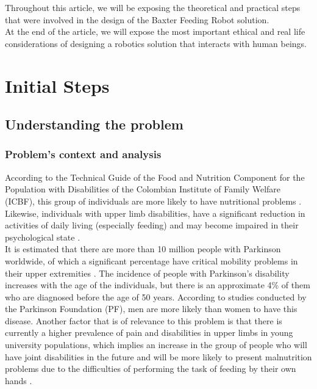 \documentclass[11pt]{report} %
\begin{document}
Throughout this article, we will be exposing the theoretical and practical steps that were involved in the design of the Baxter Feeding Robot solution.\\

At the end of the article, we will expose the most important ethical and real life considerations of designing a robotics solution that interacts with human beings.


\chapter{Initial Steps}

\section{Understanding the problem}

\subsection{Problem's context and analysis}

According to the Technical Guide of the Food and Nutrition Component for the Population with Disabilities of the Colombian Institute of Family Welfare (ICBF), this group of individuals are more likely to have nutritional problems \citep{cite_ICBF_technical_article}. Likewise, individuals with upper limb disabilities, have a significant reduction in activities of daily living (especially feeding) and may become impaired in their psychological state \citep{cite_upper_limb_disabilities_self_steem}.\\

It is estimated that there are more than 10 million people with Parkinson worldwide, of which a significant percentage have critical mobility problems in their upper extremities \citep{cite_parkinson_foundation_total_cases}. The incidence of people with Parkinson's disability increases with the age of the individuals, but there is an approximate 4\% of them who are diagnosed before the age of 50 years. According to studies conducted by the Parkinson Foundation (PF), men are more likely than women to have this disease. Another factor that is of relevance to this problem is that there is currently a higher prevalence of pain and disabilities in upper limbs in young university populations, which implies an increase in the group of people who will have joint disabilities in the future and will be more likely to present malnutrition problems due to the difficulties of performing the task of feeding by their own hands \citep{cite_park_active_robot_assisted_feeding}.\\
\end{document}

